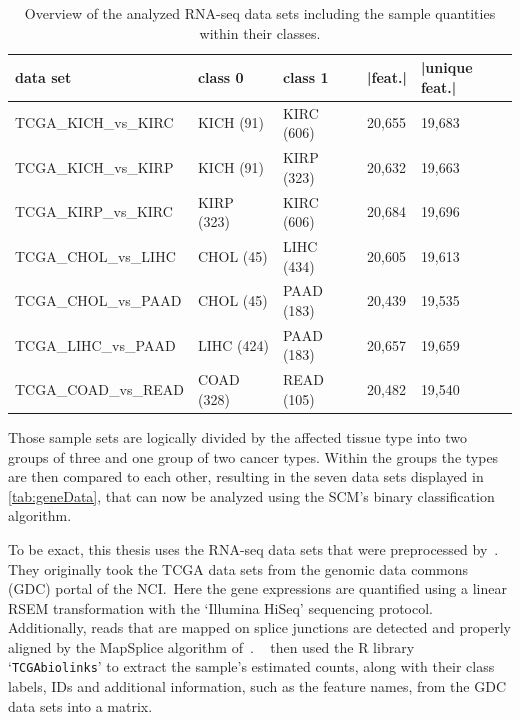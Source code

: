 \begin{table}[ht]
        \centering
        \caption{Overview of the analyzed RNA-seq data sets including the sample quantities within their classes.}\label{tab:geneData}
        \begin{tabular}{lllll}
            \toprule
            data set & class 0 & class 1 & |feat.| & |unique feat.| \\
            \midrule
            TCGA\_KICH\_vs\_KIRC & KICH (91) & KIRC (606) & 20,655 & 19,683 \\
            TCGA\_KICH\_vs\_KIRP & KICH (91) & KIRP (323) & 20,632 & 19,663 \\
            TCGA\_KIRP\_vs\_KIRC & KIRP (323) & KIRC (606) & 20,684 & 19,696 \\
            TCGA\_CHOL\_vs\_LIHC & CHOL (45) & LIHC (434) & 20,605 & 19,613 \\
            TCGA\_CHOL\_vs\_PAAD & CHOL (45) & PAAD (183) & 20,439 & 19,535 \\
            TCGA\_LIHC\_vs\_PAAD & LIHC (424) & PAAD (183) & 20,657 & 19,659 \\
            TCGA\_COAD\_vs\_READ & COAD (328) & READ (105) & 20,482 & 19,540 \\
            \bottomrule
        \end{tabular}
\end{table}

Those sample sets are logically divided by the affected tissue type into two groups of three and one group of two cancer types.
Within the groups the types are then compared to each other, resulting in the seven
data sets displayed in \autoref{tab:geneData}, that can now be analyzed using the SCM's binary classification algorithm.

To be exact, this thesis uses the RNA-seq data sets that were preprocessed by~\cite{lausser20}.
They originally took the TCGA data sets from the genomic data commons (GDC) portal of the NCI.\
Here the gene expressions are quantified using a linear RSEM transformation with the `Illumina HiSeq' sequencing protocol.
Additionally, reads that are mapped on splice junctions are detected and properly aligned by the MapSplice algorithm of~\cite{wang10}.
~\cite{lausser20} then used the R library `\texttt{TCGAbiolinks}' to extract the sample's estimated counts,
along with their class labels, IDs and additional information, such as the feature names, from the GDC data sets into a matrix.

